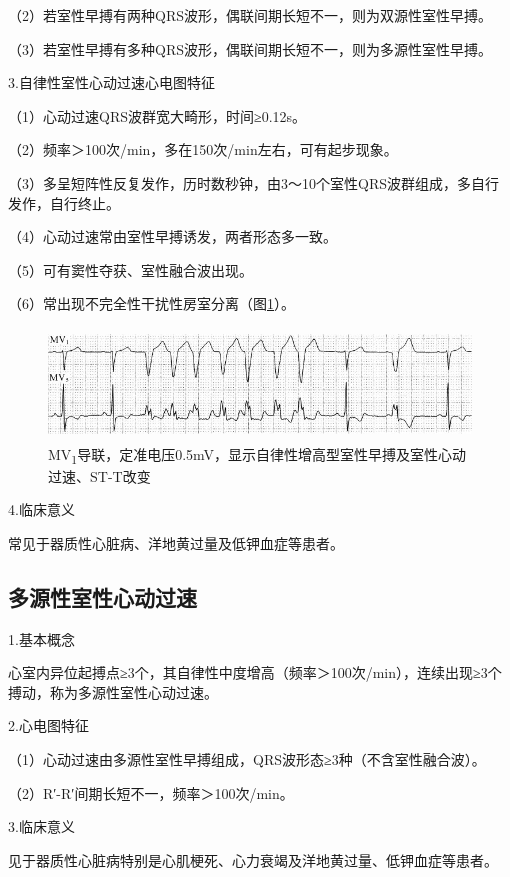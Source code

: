 （2）若室性早搏有两种QRS波形，偶联间期长短不一，则为双源性室性早搏。

（3）若室性早搏有多种QRS波形，偶联间期长短不一，则为多源性室性早搏。

3.自律性室性心动过速心电图特征

（1）心动过速QRS波群宽大畸形，时间≥0.12s。

（2）频率＞100次/min，多在150次/min左右，可有起步现象。

（3）多呈短阵性反复发作，历时数秒钟，由3～10个室性QRS波群组成，多自行发作，自行终止。

（4）心动过速常由室性早搏诱发，两者形态多一致。

（5）可有窦性夺获、室性融合波出现。

（6）常出现不完全性干扰性房室分离（图\ref{fig15-10}）。

\begin{figure}[!htbp]
 \centering
 \includegraphics[width=4.97917in,height=1.16667in]{./images/Image00276.jpg}
 \captionsetup{justification=centering}
 \caption{MV\textsubscript{1}导联，定准电压0.5mV，显示自律性增高型室性早搏及室性心动过速、ST-T改变}
 \label{fig15-10}
  \end{figure} 


4.临床意义

常见于器质性心脏病、洋地黄过量及低钾血症等患者。

\protect\hypertarget{text00022.htmlux5cux23subid273}{}{}

\subsection{多源性室性心动过速}

1.基本概念

心室内异位起搏点≥3个，其自律性中度增高（频率＞100次/min），连续出现≥3个搏动，称为多源性室性心动过速。

2.心电图特征

（1）心动过速由多源性室性早搏组成，QRS波形态≥3种（不含室性融合波）。

（2）R′-R′间期长短不一，频率＞100次/min。

3.临床意义

见于器质性心脏病特别是心肌梗死、心力衰竭及洋地黄过量、低钾血症等患者。

